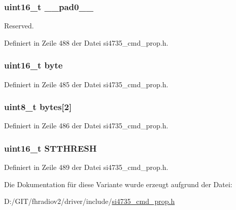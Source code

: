 \subsubsection[{\+\_\+\+\_\+pad0\+\_\+\+\_\+}]{\setlength{\rightskip}{0pt plus 5cm}uint16\+\_\+t \+\_\+\+\_\+pad0\+\_\+\+\_\+}\label{unionfm__blend__stereo_a77132c2c26a75f5b8751b235cda23828}


Reserved. 



Definiert in Zeile 488 der Datei si4735\+\_\+cmd\+\_\+prop.\+h.

\hypertarget{unionfm__blend__stereo_ab0549c1b5ea980a02e7eab77e21fea49}{}
\subsubsection[{byte}]{\setlength{\rightskip}{0pt plus 5cm}uint16\+\_\+t byte}\label{unionfm__blend__stereo_ab0549c1b5ea980a02e7eab77e21fea49}


Definiert in Zeile 485 der Datei si4735\+\_\+cmd\+\_\+prop.\+h.

\hypertarget{unionfm__blend__stereo_a46e4c05d20a047ec169f60d3167e912e}{}
\subsubsection[{bytes}]{\setlength{\rightskip}{0pt plus 5cm}uint8\+\_\+t bytes\mbox{[}2\mbox{]}}\label{unionfm__blend__stereo_a46e4c05d20a047ec169f60d3167e912e}


Definiert in Zeile 486 der Datei si4735\+\_\+cmd\+\_\+prop.\+h.

\hypertarget{unionfm__blend__stereo_a657a0ae89d4ea37bac29c56d527e1454}{}
\subsubsection[{S\+T\+T\+H\+R\+E\+S\+H}]{\setlength{\rightskip}{0pt plus 5cm}uint16\+\_\+t S\+T\+T\+H\+R\+E\+S\+H}\label{unionfm__blend__stereo_a657a0ae89d4ea37bac29c56d527e1454}


Definiert in Zeile 489 der Datei si4735\+\_\+cmd\+\_\+prop.\+h.



Die Dokumentation für diese Variante wurde erzeugt aufgrund der Datei\+:\begin{DoxyCompactItemize}
\item 
D\+:/\+G\+I\+T/fhradiov2/driver/include/\hyperlink{si4735__cmd__prop_8h}{si4735\+\_\+cmd\+\_\+prop.\+h}\end{DoxyCompactItemize}
